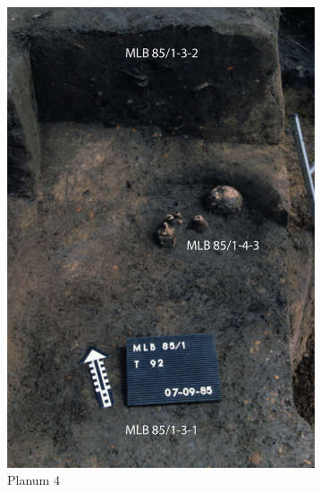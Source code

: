 \begin{figure}[tb]
 \begin{subfigure}{\columnwidth}
 \centering
 \includegraphics[width=\columnwidth]{fig/MLB85-1_Pl4_E85-031-34.pdf}
 \caption{Planum 4}
 \label{fig:MLB85-1_Pl4}
 \end{subfigure}\hfill
 \begin{subfigure}{\columnwidth}
 \centering

\end{subfigure}
\end{figure}
